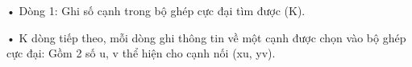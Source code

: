 • Dòng 1: Ghi số cạnh trong bộ ghép cực đại tìm được (K).   


   • K dòng tiếp theo, mỗi dòng ghi thông tin về một cạnh được chọn vào bộ ghép cực đại: Gồm 2 số u, v thể hiện cho cạnh nối (xu, yv).